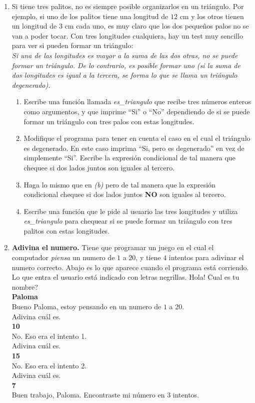 \documentclass[10pt, twocolumn]{article}
\begin{document}
\begin{enumerate}
\item Si tiene tres palitos, no es siempre posible organizarlos en un triángulo. Por ejemplo, si uno de los palitos tiene una longitud de $12$ cm y los otros tienen un longitud de $3$ cm cada uno, es muy claro que los dos pequeños palos no se van a poder tocar. Con tres longitudes cualquiera, hay un test muy sencillo para ver si pueden formar un triángulo:\\
	\vskip -4mm
	\emph{Si una de las longitudes es mayor a la suma de las dos otras, no se puede formar un triángulo. De lo contrario, es posible formar uno (si la suma de dos longitudes es igual a la tercera, se forma lo que se llama un triángulo degenerado).}
\begin{enumerate}
	\item Escribe una función llamada \emph{es\_triangulo} que recibe tres números enteros como argumentos, y que imprime ``Si'' o ``No'' dependiendo de si se puede formar un triángulo con tres palos con estas longitudes. 
	\item Modifique el programa para tener en cuenta el caso en el cual el triángulo es degenerado. En este caso imprima ``Si, pero es degenerado'' en vez de simplemente ``Si''. Escribe la expresión condicional de tal manera que chequee si dos lados juntos son iguales al tercero.
	\item Haga lo mismo que en \emph{(b)} pero de tal manera que la expresión condicional chequee si dos lados juntos \textbf{NO} son iguales al tercero. 
	\item Escribe una función que le pide al usuario las tres longitudes y utiliza \emph{es\_triangulo} para chequear si se puede formar un triángulo con tres palitos con estas longitudes.
\end{enumerate}

\item {\textbf{Adivina el numero.}} Tiene que programar un juego en el cual el computador \emph{piensa} un numero de $1$ a $20$, y tiene $4$ intentos para adivinar el numero correcto. Abajo es lo que aparece cuando el programa está corriendo. Lo que entra el usuario está indicado con letras negrillas.
\vskip 1mm
Hola! Cual es tu nombre?\\
\textbf{Paloma}\\
Bueno Paloma, estoy pensando en un numero de $1$ a $20$.\\
Adivina cuál es.\\
\textbf{10}\\
No. Eso era el intento 1.\\
Adivina cuál es.\\
\textbf{15}\\
No. Eso era el intento 2.\\
Adivina cuál es.\\
\textbf{7}\\
Buen trabajo, Paloma. Encontraste mi número en 3 intentos.


\end{enumerate}
\end{document}
